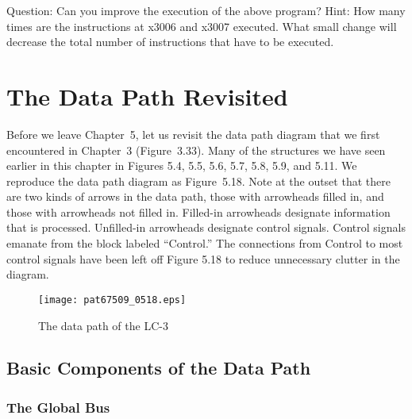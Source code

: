 \documentclass{patt}
\begin{document}
Question: Can you improve the execution of the above program?  Hint:
How many times are the instructions at x3006 and x3007 executed.
What small change will decrease the total number of instructions that have
to be executed.
\vspace{-6pt}

\section{The Data Path Revisited}

Before we leave Chapter~5, let us revisit the data path diagram that
we first encountered in Chapter~3 (Figure~3.33).  Many of the structures
we have seen earlier in this chapter in Figures 5.4, 5.5,
5.6, 5.7, 5.8, 5.9, and 5.11.  We reproduce the data path diagram as 
Figure~5.18.  Note at the outset that there are two kinds of arrows in the
data path, those with arrowheads filled in, and those with arrowheads
not filled in.  Filled-in arrowheads designate information that is
processed.  Unfilled-in arrowheads designate control signals.  Control
signals emanate from the block labeled ``Control.''  The connections
from Control to most control signals have been left off Figure 5.18 to
reduce unnecessary clutter in the diagram.

\begin{figure}
\hspace*{-8pc}\begin{minipage}{36pc}
\centerline{\texttt{[image: pat67509\_0518.eps]}}
\caption{The data path of the LC-3}
\label{fig:lc2datapath2}
\end{minipage}
\end{figure}

\subsection{Basic Components of the Data Path}

\vspace{-2pt}

\subsubsection{The Global Bus}
\end{document}
